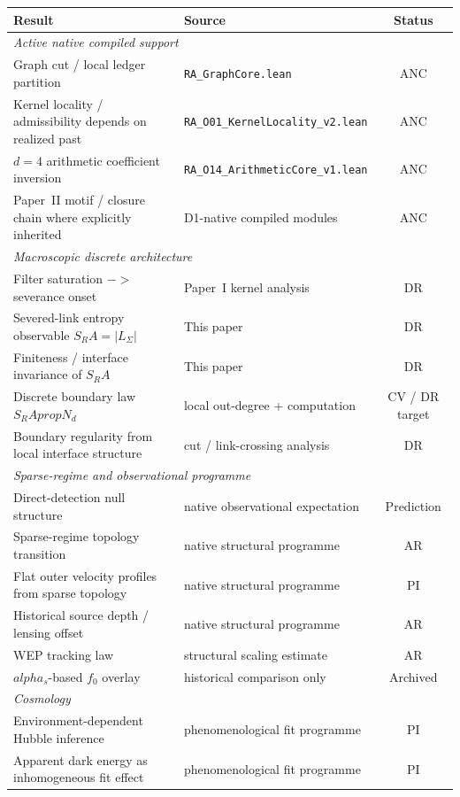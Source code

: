 \documentclass[11pt]{article}
\def\alpha{alpha}%
\def\mathrm#1{#1}%
\def\to{->}%
\def\partial{d}%
\def\propto{prop}%
\def\SRa{S_RA}%
\newcommand{\SRa}{S_{\mathrm{RA}}}
\begin{document}
\begin{center}
\begin{tabular}{llc}
\toprule
Result & Source & Status \\
\midrule
\multicolumn{3}{l}{\textit{Active native compiled support}} \\
Graph cut / local ledger partition & \texttt{RA\_GraphCore.lean} & ANC \\
Kernel locality / admissibility depends on realized past & \texttt{RA\_O01\_KernelLocality\_v2.lean} & ANC \\
$d=4$ arithmetic coefficient inversion & \texttt{RA\_O14\_ArithmeticCore\_v1.lean} & ANC \\
Paper~II motif / closure chain where explicitly inherited & D1-native compiled modules & ANC \\
\midrule
\multicolumn{3}{l}{\textit{Macroscopic discrete architecture}} \\
Filter saturation $\to$ severance onset & Paper~I kernel analysis & DR \\
Severed-link entropy observable $\SRa=|L_\Sigma|$ & This paper & DR \\
Finiteness / interface invariance of $\SRa$ & This paper & DR \\
Discrete boundary law $\SRa\propto N_\partial$ & local out-degree + computation & CV / DR target \\
Boundary regularity from local interface structure & cut / link-crossing analysis & DR \\
\midrule
\multicolumn{3}{l}{\textit{Sparse-regime and observational programme}} \\
Direct-detection null structure & native observational expectation & Prediction \\
Sparse-regime topology transition & native structural programme & AR \\
Flat outer velocity profiles from sparse topology & native structural programme & PI \\
Historical source depth / lensing offset & native structural programme & AR \\
WEP tracking law & structural scaling estimate & AR \\
$\alpha_s$-based $f_0$ overlay & historical comparison only & Archived \\
\midrule
\multicolumn{3}{l}{\textit{Cosmology}} \\
Environment-dependent Hubble inference & phenomenological fit programme & PI \\
Apparent dark energy as inhomogeneous fit effect & phenomenological fit programme & PI \\

\end{tabular}
\end{center}
\end{document}

